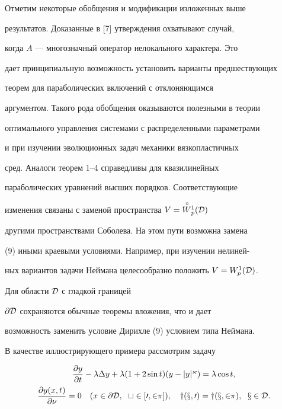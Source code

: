  


Отметим некоторые обобщения и модификации изложенных выше 


результатов. Доказанные в [7] утверждения охватывают случай, 


когда $A$ --- многозначный оператор нелокального характера. Это 


дает принципиальную возможность установить варианты предшествующих 


теорем для параболических включений с отклоняющимся 


аргументом. Такого рода обобщения оказываются полезными в теории 


оптимального управления системами с распределенными параметрами 


и при изучении эволюционных задач механики вязкопластичных 


сред. Аналоги теорем 1--4 справедливы для квазилинейных 


параболических уравнений высших порядков. Соответствующие 


изменения связаны с заменой пространства $V=\overset{\,\circ}{W}{}^1_p(\cal D)$ 


другими пространствами Соболева. На этом пути возможна замена 


(9) иными краевыми условиями. Например, при изучении нелиней- 


ных вариантов задачи Неймана целесообразно положить $V=W^1_p(\cal D)$. 


Для области $\cal D$ с гладкой границей 


$\partial\cal D$ сохраняются обычные теоремы вложения, что и дает 


возможность заменить условие Дирихле (9) условием типа Неймана. 


 


В качестве иллюстрирующего примера рассмотрим задачу 


\begin{equation} 


\begin{array}{c} 


\dfrac{\partial y}{\partial t}-\lambda\Delta y+ 


\lambda(1+2\sin t)(y-|y|^\varkappa)=\lambda\cos t,\\[3mm] 


\dfrac{\partial y(x,t)}{\partial \nu}=0\quad 


(x\in\partial\cal D,\ \; t\in[0,2\pi]),\quad 


y(x,0)=y(x,2\pi),\ \; x\in\cal D. 


\end{array} 


\end{equation} 


